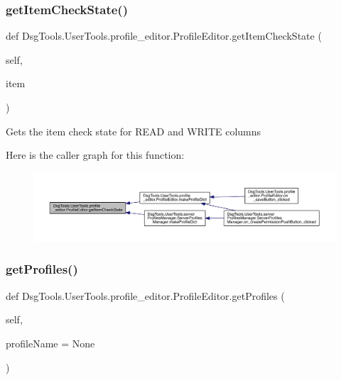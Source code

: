 \subsubsection{\texorpdfstring{get\+Item\+Check\+State()}{getItemCheckState()}}
{\footnotesize\ttfamily def Dsg\+Tools.\+User\+Tools.\+profile\+\_\+editor.\+Profile\+Editor.\+get\+Item\+Check\+State (\begin{DoxyParamCaption}\item[{}]{self,  }\item[{}]{item }\end{DoxyParamCaption})}

\begin{DoxyVerb}Gets the item check state for READ and WRITE columns
\end{DoxyVerb}
 Here is the caller graph for this function\+:
\nopagebreak
\begin{figure}[H]
\begin{center}
\leavevmode
\includegraphics[width=350pt]{class_dsg_tools_1_1_user_tools_1_1profile__editor_1_1_profile_editor_a1b792eeaccf84be33cabd36287492265_icgraph}
\end{center}
\end{figure}
\mbox{\label{class_dsg_tools_1_1_user_tools_1_1profile__editor_1_1_profile_editor_ae315bbaa474d1424260898dc694e43a7}} 
\subsubsection{\texorpdfstring{get\+Profiles()}{getProfiles()}}
{\footnotesize\ttfamily def Dsg\+Tools.\+User\+Tools.\+profile\+\_\+editor.\+Profile\+Editor.\+get\+Profiles (\begin{DoxyParamCaption}\item[{}]{self,  }\item[{}]{profile\+Name = {\ttfamily None} }\end{DoxyParamCaption})}

